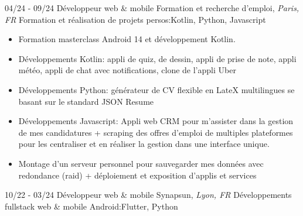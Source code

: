 \documentclass[]{friggeri-cv}
\begin{document}
\begin{entrylist}
  \entry
    {04/24 - 09/24}
    {Développeur web \& mobile}
    {Formation et recherche d'emploi, \textit{Paris, FR}}
    {Formation et réalisation de projets persos:\hspace*{8mm}Kotlin, Python, Javascript}
\end{entrylist}
\vspace{-15pt}

\vspace{0.5mm}
\begin{itemize}
\setlength{\itemsep}{1pt}
\setlength{\parskip}{0pt}
\setlength{\parsep}{0pt}

\item Formation masterclass Android 14 et développement Kotlin.
\item Développements Kotlin: appli de quiz, de dessin, appli de prise de note, appli météo, appli de chat avec notifications, clone de l'appli Uber
\item Développements Python: générateur de CV flexible en LateX multilingues se basant sur le standard JSON Resume
\item Développements Javascript: Appli web CRM pour m'assister dans la gestion de mes candidatures + scraping des offres d'emploi de multiples plateformes pour les centraliser et en réaliser la gestion dans une interface unique.
\item Montage d'un serveur personnel pour sauvegarder mes données avec redondance (raid) + déploiement et exposition d'applis et services
\end{itemize}

\begin{entrylist}
  \entry
    {10/22 - 03/24}
    {Développeur web \& mobile}
    {Synapsun, \textit{Lyon, FR}}
    {Développements fullstack web \& mobile Android:\hspace*{8mm}Flutter, Python}
\end{entrylist}
\vspace{-15pt}
\end{document}
